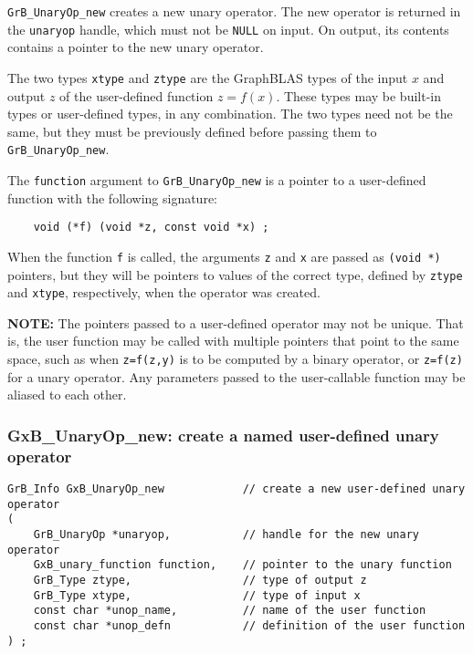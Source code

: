\documentclass[12pt]{article}
\begin{document}
\verb'GrB_UnaryOp_new' creates a new unary operator.  The new operator is
returned in the \verb'unaryop' handle, which must not be \verb'NULL' on input.
On output, its contents contains a pointer to the new unary operator.

The two types \verb'xtype' and \verb'ztype' are the GraphBLAS types of the
input $x$ and output $z$ of the user-defined function $z=f(x)$.  These types
may be built-in types or user-defined types, in any combination.  The two types
need not be the same, but they must be previously defined before passing them
to \verb'GrB_UnaryOp_new'.

The \verb'function' argument to \verb'GrB_UnaryOp_new' is a pointer to a
user-defined function with the following signature:

    {\footnotesize
    \begin{verbatim}
    void (*f) (void *z, const void *x) ; \end{verbatim} }

When the function \verb'f' is called, the arguments \verb'z' and \verb'x' are
passed as \verb'(void *)' pointers, but they will be pointers to values of the
correct type, defined by \verb'ztype' and \verb'xtype', respectively, when the
operator was created.

{\bf NOTE:}
The pointers passed to a user-defined operator may not be unique.  That is, the
user function may be called with multiple pointers that point to the same
space, such as when \verb'z=f(z,y)' is to be computed by a binary operator, or
\verb'z=f(z)' for a unary operator.  Any parameters passed to the user-callable
function may be aliased to each other.

\newpage
\subsubsection{{\sf GxB\_UnaryOp\_new:} create a named user-defined unary operator}
\label{unaryop_new_named}

\begin{mdframed}[userdefinedwidth=6in]
{\footnotesize
\begin{verbatim}
GrB_Info GxB_UnaryOp_new            // create a new user-defined unary operator
(
    GrB_UnaryOp *unaryop,           // handle for the new unary operator
    GxB_unary_function function,    // pointer to the unary function
    GrB_Type ztype,                 // type of output z
    GrB_Type xtype,                 // type of input x
    const char *unop_name,          // name of the user function
    const char *unop_defn           // definition of the user function
) ;
\end{verbatim} }\end{mdframed}
\end{document}
